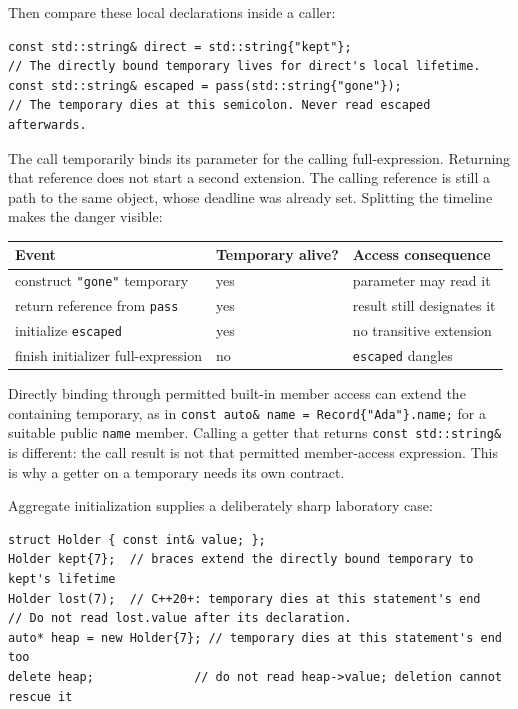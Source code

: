 Then compare these local declarations inside a caller:

\begin{verbatim}
const std::string& direct = std::string{"kept"};
// The directly bound temporary lives for direct's local lifetime.
const std::string& escaped = pass(std::string{"gone"});
// The temporary dies at this semicolon. Never read escaped afterwards.
\end{verbatim}

The call temporarily binds its parameter for the calling full-expression. Returning that reference does not start a second extension. The calling reference is still a path to the same object, whose deadline was already set. Splitting the timeline makes the danger visible:

{\def\LTcaptype{none} %
\begin{longtable}[]{@{}lll@{}}
\toprule\noalign{}
Event & Temporary alive? & Access consequence \\
\midrule\noalign{}
\endhead
\bottomrule\noalign{}
\endlastfoot
construct \texttt{"gone"} temporary & yes & parameter may read it \\
return reference from \texttt{pass} & yes & result still designates it \\
initialize \texttt{escaped} & yes & no transitive extension \\
finish initializer full-expression & no & \texttt{escaped} dangles \\
\end{longtable}
}

Directly binding through permitted built-in member access can extend the containing temporary, as in \texttt{const\ auto\&\ name\ =\ Record\{"Ada"\}.name;} for a suitable public \texttt{name} member. Calling a getter that returns \texttt{const\ std::string\&} is different: the call result is not that permitted member-access expression. This is why a getter on a temporary needs its own contract.

Aggregate initialization supplies a deliberately sharp laboratory case:

\begin{verbatim}
struct Holder { const int& value; };
Holder kept{7};  // braces extend the directly bound temporary to kept's lifetime
Holder lost(7);  // C++20+: temporary dies at this statement's end
// Do not read lost.value after its declaration.
auto* heap = new Holder{7}; // temporary dies at this statement's end too
delete heap;              // do not read heap->value; deletion cannot rescue it
\end{verbatim}

